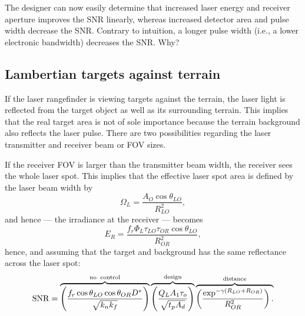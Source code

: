 The designer can now easily determine that increased laser energy and receiver aperture improves the SNR linearly, whereas increased detector area and pulse width decrease the SNR. Contrary to intuition, a longer pulse width (i.e., a lower electronic bandwidth) decreases the SNR. Why?


\subsection{Lambertian targets against terrain}
\noindent
If the laser rangefinder is viewing targets against the terrain, the laser light is reflected from the target object as well as its  surrounding terrain. This implies that the real target area is not of sole importance because the terrain background also reflects the laser pulse. There are two possibilities regarding the laser transmitter and receiver beam or FOV sizes.



If the receiver FOV  is larger than the transmitter beam width, the receiver sees the whole laser spot. This implies that the effective laser spot area is defined by the laser beam width by
\begin{equation}
\Omega_L=\frac{A_O\cos\theta_{LO}}{R^2_{LO}},
\end{equation}
and hence  --- the irradiance at the receiver ---  becomes
\begin{equation}
E_R = \frac{
f_r  \Phi_L \tau_{LO}\tau_{OR} \cos\theta_{LO}}{R^2_{OR} }\label{lrfi1}, 
\end{equation}
hence, and assuming that the target and background has the same reflectance across the laser spot:
\begin{equation}
\operatorname{SNR}=
\overbrace{
\left(\frac{f_r \cos\theta_{LO} \cos\theta_{OR} D^\ast }{\sqrt{k_nk_f}}\right)
}^{\rm no\;\;control}
\overbrace{
\left(\frac{Q_L A_1 \tau_o }{\sqrt{t_p A_d}}\right)
}^{\rm design}
\overbrace{
\left(\frac{\exp^{-\gamma (R_{LO}+R_{OR})} }{R^2_{OR}}\right).\\
}^{\rm distance}
\label{lrfd2d}
\end{equation}


